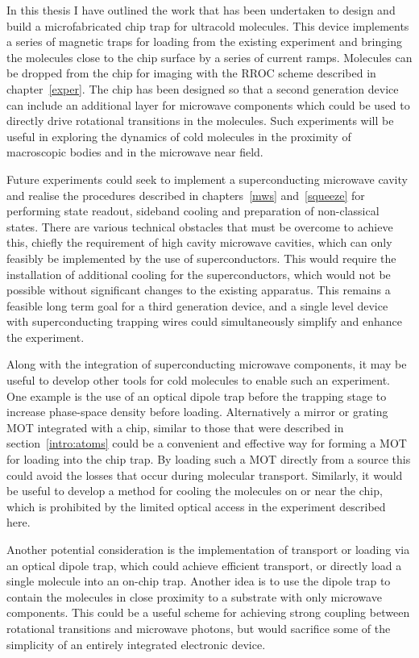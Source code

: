 In this thesis I have outlined the work that has been undertaken to design and
build a microfabricated chip trap for ultracold molecules. This device
implements a series of magnetic traps for loading from the existing \CaF{}
experiment and bringing the molecules close to the chip surface by a series of
current ramps. Molecules can be dropped from the chip for imaging with the RROC
scheme described in chapter~\ref{exper}. The chip has been designed so
that a second generation device can include an additional layer for microwave
components which could be used to directly drive rotational transitions in the
molecules. Such experiments will be useful in exploring the dynamics of cold
molecules in the proximity of macroscopic bodies and in the microwave near
field.

Future experiments could seek to implement a superconducting microwave cavity
and realise the procedures described in chapters~\ref{mws} and~\ref{squeeze}
for performing state readout, sideband cooling and preparation of non-classical
states. There are various technical obstacles that must be overcome to achieve
this, chiefly the requirement of high cavity microwave cavities, which can only
feasibly be implemented by the use of superconductors.  This would require the
installation of additional cooling for the superconductors, which would not be
possible without significant changes to the existing apparatus. This
remains a feasible long term goal for a third generation device, and a
single level device with superconducting trapping wires could simultaneously
simplify and enhance the experiment.

Along with the integration of superconducting microwave components, it may be
useful to develop other tools for cold molecules to enable such an experiment.
One example is the use of an optical dipole trap before the trapping stage to
increase phase-space density before loading.  Alternatively a mirror or grating
MOT integrated with a chip, similar to those that were described in
section~\ref{intro:atoms} could be a convenient and effective way for forming a
\CaF{} MOT for loading into the chip trap. By loading such a MOT directly from
a source this could avoid the losses that occur during molecular transport.
Similarly, it would be useful to develop a method for cooling the molecules on
or near the chip, which is prohibited by the limited optical access in the
experiment described here.

Another potential consideration is the implementation of transport or loading
via an optical dipole trap, which could achieve efficient transport, or
directly load a single molecule into an on-chip trap. Another idea is to use
the dipole trap to contain the molecules in close proximity to a substrate with
only microwave components. This could be a useful scheme for achieving strong
coupling between rotational transitions and microwave photons, but would
sacrifice some of the simplicity of an entirely integrated electronic device.

